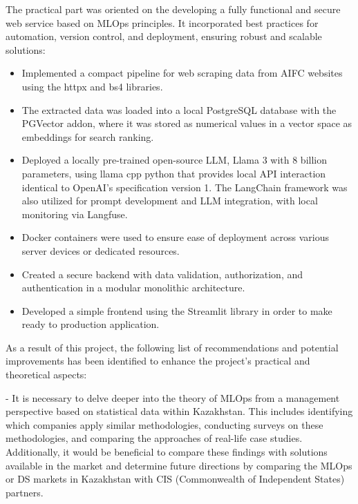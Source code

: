 The practical part was oriented on the developing a fully functional and secure web service based on MLOps principles. It incorporated best practices for automation, version control, and deployment, ensuring robust and scalable solutions:
\begin{itemize}
    \item Implemented a compact pipeline for web scraping data from AIFC websites using the httpx and bs4 libraries.
    \item The extracted data was loaded into a local PostgreSQL database with the PGVector addon, where it was stored as numerical values in a vector space as embeddings for search ranking.
    \item Deployed a locally pre-trained open-source LLM, Llama 3 with 8 billion parameters, using llama cpp python that provides local API interaction identical to OpenAI's specification version 1. The LangChain framework was also utilized for prompt development and LLM integration, with local monitoring via Langfuse.
    \item Docker containers were used to ensure ease of deployment across various server devices or dedicated resources.
    \item Created a secure backend with data validation, authorization, and authentication in a modular monolithic architecture.
    \item Developed a simple frontend using the Streamlit library in order to make ready to production application.
\end{itemize}

As a result of this project, the following list of recommendations and potential improvements has been identified to enhance the project's practical and theoretical aspects:

- It is necessary to delve deeper into the theory of MLOps from a management perspective based on statistical data within Kazakhstan. This includes identifying which companies apply similar methodologies, conducting surveys on these methodologies, and comparing the approaches of real-life case studies. Additionally, it would be beneficial to compare these findings with solutions available in the market and determine future directions by comparing the MLOps or DS markets in Kazakhstan with CIS (Commonwealth of Independent States) partners.

